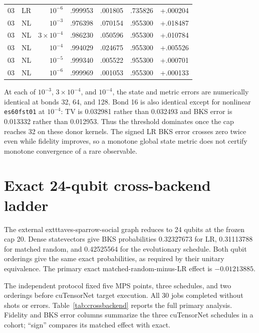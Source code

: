 \documentclass[10pt]{article}
\begin{document}
\begin{table}[h]
\begin{tabular}{llrrrrr}
03 & LR & $10^{-6}$ & .999953 & .001805 & .735826 & +.000204 \\
03 & NL & $10^{-3}$ & .976398 & .070154 & .955300 & +.018487 \\
03 & NL & $3\times10^{-4}$ & .986230 & .050596 & .955300 & +.010784 \\
03 & NL & $10^{-4}$ & .994029 & .024675 & .955300 & +.005526 \\
03 & NL & $10^{-5}$ & .999340 & .005522 & .955300 & +.000701 \\
03 & NL & $10^{-6}$ & .999969 & .001053 & .955300 & +.000133 \\
\bottomrule
\end{tabular}
\end{table}

At each of $10^{-3}$, $3\times10^{-4}$, and $10^{-4}$, the state and metric
errors are numerically identical at bonds 32, 64, and 128. Bond 16 is also
identical except for nonlinear \texttt{es60fst01} at $10^{-4}$: TV is
0.032981 rather than 0.032493 and BKS error is 0.013332 rather than 0.012953.
Thus the threshold dominates once the cap reaches 32 on these donor kernels.
The signed LR BKS error crosses zero twice even while fidelity improves, so a
monotone global state metric does not certify monotone convergence of a rare
observable.

\FloatBarrier
\section{Exact 24-qubit cross-backend ladder}

The external 	exttt{aves-sparrow-social} graph reduces to 24 qubits at the
frozen cap 20. Dense statevectors give BKS probabilities 0.32327673 for LR,
0.31113788 for matched random, and 0.42525564 for the evolutionary schedule.
Both qubit orderings give the same exact probabilities, as required by their
unitary equivalence. The primary exact matched-random-minus-LR effect is
$-0.01213885$.

The independent protocol fixed five MPS points, three schedules, and two
orderings before cuTensorNet target execution. All 30 jobs completed without
shots or errors. Table~\ref{tab:crossbackend} reports the full primary analysis.
Fidelity and BKS error columns summarize the three cuTensorNet schedules in a
cohort; ``sign'' compares its matched effect with exact.
\end{document}
